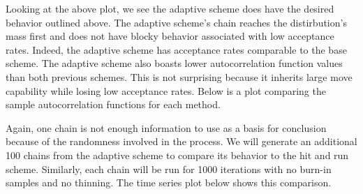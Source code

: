 \documentclass{phd}\usepackage[]{graphicx}\usepackage[]{color}
\makeatletter
\newenvironment{kframe}{%
 \def\at@end@of@kframe{}%
 \ifinner\ifhmode%
  \def\at@end@of@kframe{\end{minipage}}%
  \begin{minipage}{\columnwidth}%
 \fi\fi%
 \def\FrameCommand##1{\hskip\@totalleftmargin \hskip-\fboxsep
 \colorbox{shadecolor}{##1}\hskip-\fboxsep
     \hskip-\linewidth \hskip-\@totalleftmargin \hskip\columnwidth}%
 \MakeFramed {\advance\hsize-\width
   \@totalleftmargin\z@ \linewidth\hsize
   \@setminipage}}%
 {\par\unskip\endMakeFramed%
 \at@end@of@kframe}
\newenvironment{knitrout}{}{} %
\makeatother
\begin{document}
Looking at the above plot, we see the adaptive scheme does have the desired behavior outlined above. The adaptive scheme's chain reaches the distirbution's mass first and does not have blocky behavior associated with low acceptance rates. Indeed, the adaptive scheme has acceptance rates comparable to the base scheme. The adaptive scheme also boasts lower autocorrelation function values than both previous schemes. This is not surprising because it inherits large move capability while losing low acceptance rates. Below is a plot comparing the sample autocorrelation functions for each method. 

\begin{knitrout}
\color{fgcolor}\begin{kframe}


{\ttfamily\noindent\bfseries\color{errorcolor}{\#\# Error in as.ts(x): object 'adapt\_steps' not found}}

{\ttfamily\noindent\bfseries\color{errorcolor}{\#\# Error in as.vector(base\_acf\$acf): object 'base\_acf' not found}}

{\ttfamily\noindent\bfseries\color{errorcolor}{\#\# Error in eval(lhs, parent, parent): object 'plot\_auto\_df2' not found}}\end{kframe}
\end{knitrout}

Again, one chain is not enough information to use as a basis for conclusion because of the randomness involved in the process. We will generate an additional 100 chains from the adaptive scheme to compare its behavior to the hit and run scheme. Similarly, each chain will be run for 1000 iterations with no burn-in samples and no thinning. The time series plot below shows this comparison. 

\begin{knitrout}
\color{fgcolor}\begin{kframe}


{\ttfamily\noindent\bfseries\color{errorcolor}{\#\# Error in metropolis(tbl, moves, suffStats = suff\_stats, config = A, hitAndRun = T, : unused arguments (suffStats = suff\_stats, config = A, hitAndRun = T)}}

{\ttfamily\noindent\bfseries\color{errorcolor}{\#\# Error in eval(lhs, parent, parent): object 'adapt\_chains' not found}}

{\ttfamily\noindent\bfseries\color{errorcolor}{\#\# Error in dots\_values(...): object 'har\_df' not found}}

{\ttfamily\noindent\bfseries\color{errorcolor}{\#\# Error in plot\_df2\$iter <- 1:1000: object 'plot\_df2' not found}}

{\ttfamily\noindent\bfseries\color{errorcolor}{\#\# Error in eval(lhs, parent, parent): object 'plot\_df2' not found}}

{\ttfamily\noindent\bfseries{}}\end{kframe}
\end{knitrout}
\end{document}
